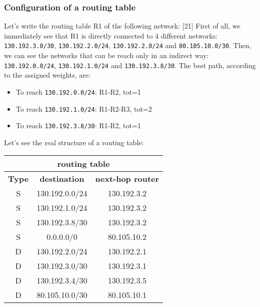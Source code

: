 \subsubsection{Configuration of a routing table}
\noindent Let's write the routing table R1 of the following network:
[21]
First of all, we immediately see that R1 is directly connected to 4 different networks: \texttt{130.192.3.0/30}, \texttt{130.192.2.0/24}, \texttt{130.192.2.0/24} and \texttt{80.105.10.0/30}. Then, we can see the networks that can be reach only in an indirect way: \texttt{130.192.0.0/24}, \texttt{130.192.1.0/24} and \texttt{130.192.3.8/30}. The best path, according to the assigned weights, are:
\begin{itemize}
    \item To reach \texttt{130.192.0.0/24}: R1-R2, tot=1
    \item To reach \texttt{130.192.1.0/24}: R1-R2-R3, tot=2
    \item To reach \texttt{130.192.3.8/30}: R1-R2, tot=1
\end{itemize}
\noindent Let's see the real structure of a routing table:

\begin{table}[h!]
    \centering
    \begin{tabular}{|ccc|}
    \hline
    \multicolumn{3}{|c|}{\textbf{routing table}} \\ \hline
    \multicolumn{1}{|c|}{\textbf{Type}} & \multicolumn{1}{c|}{\textbf{destination}} & \textbf{next-hop router} \\ \hline
    \multicolumn{1}{|c|}{S} & \multicolumn{1}{c|}{130.192.0.0/24} & 130.192.3.2 \\ \hline
    \multicolumn{1}{|c|}{S} & \multicolumn{1}{c|}{130.192.1.0/24} & 130.192.3.2 \\ \hline
    \multicolumn{1}{|c|}{S} & \multicolumn{1}{c|}{130.192.3.8/30} & 130.192.3.2 \\ \hline
    \multicolumn{1}{|c|}{S} & \multicolumn{1}{c|}{0.0.0.0/0} & 80.105.10.2 \\ \hline
    \multicolumn{1}{|c|}{D} & \multicolumn{1}{c|}{130.192.2.0/24} & 130.192.2.1 \\ \hline
    \multicolumn{1}{|c|}{D} & \multicolumn{1}{c|}{130.192.3.0/30} & 130.192.3.1 \\ \hline
    \multicolumn{1}{|c|}{D} & \multicolumn{1}{c|}{130.192.3.4/30} & 130.192.3.5 \\ \hline
    \multicolumn{1}{|c|}{D} & \multicolumn{1}{c|}{80.105.10.0/30} & 80.105.10.1 \\ \hline
    \end{tabular}
\end{table}

